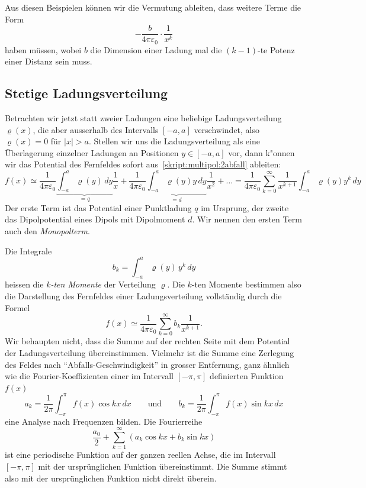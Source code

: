 Aus diesen Beispielen können wir die Vermutung ableiten, dass weitere
Terme die Form
\[
-\frac{b}{4\pi\varepsilon_0}\cdot\frac1{x^k}
\]
haben müssen, wobei $b$ die Dimension einer Ladung mal die $(k-1)$-te
Potenz einer Distanz sein muss.

\subsection{Stetige Ladungsverteilung%
\label{skript:multipol:section:stetigeladungsverteilung}}
Betrachten wir jetzt statt zweier Ladungen eine beliebige 
Ladungsverteilung $\varrho(x)$, die aber ausserhalb des Intervalls
$[-a,a]$ verschwindet, also $\varrho(x)=0$ für $|x|>a$.
Stellen wir uns die Ladungsverteilung als eine Überlagerung einzelner
Ladungen an Positionen $y\in[-a,a]$ vor, dann k"onnen wir das
Potential des Fernfeldes sofort aus~\eqref{skript:multipol:2abfall}
ableiten:
\[
f(x)
\simeq
\frac{1}{4\pi\varepsilon_0}
\underbrace{\int_{-a}^a \varrho(y)\,dy }_{\displaystyle =q}
\frac1x
+
\frac{1}{4\pi\varepsilon_0}
\underbrace{\int_{-a}^a \varrho(y)y \,dy}_{\displaystyle =d}
\frac1{x^2}
+
\dots
=
\frac{1}{4\pi\varepsilon_0}
\sum_{k=0}^\infty
\frac1{x^{k+1}} 
\int_{-a}^a\varrho(y)y^k\,dy
\]
Der erste Term ist das Potential einer Punktladung $q$ im Ursprung, der
zweite das Dipolpotential eines Dipols mit Dipolmoment $d$.
Wir nennen den ersten Term auch den {\em Monopolterm}.
%

Die Integrale 
\[
b_k=\int_{-a}^a \varrho(y)\,y^k\,dy
\]
heissen die {\em $k$-ten Momente} der Verteilung $\varrho$.
%
Die $k$-ten Momente bestimmen also die Darstellung des Fernfeldes
einer Ladungsverteilung vollständig durch die Formel
\[
f(x)
\simeq
\frac1{4\pi\varepsilon_0}\sum_{k=0}^\infty b_k\frac{1}{x^{k+1}}.
\]
Wir behaupten nicht, dass die Summe auf der rechten Seite mit dem Potential
der Ladungsverteilung übereinstimmen.
Vielmehr ist die Summe eine Zerlegung des Feldes
nach ``Abfalls-Geschwindigkeit'' in grosser Entfernung,
ganz ähnlich wie die Fourier-Koeffizienten einer im Intervall
$[-\pi,\pi]$ definierten Funktion $f(x)$
\[
a_k=\frac1{2\pi}\int_{-\pi}^\pi f(x)\cos kx\,dx
\qquad\text{und}\qquad
b_k=\frac1{2\pi}\int_{-\pi}^\pi f(x)\sin kx\,dx
\]
eine Analyse nach Frequenzen bilden.
Die Fourierreihe
\[
\frac{a_0}2+\sum_{k=1}^\infty (a_k\cos kx+b_k\sin kx)
\]
ist eine periodische Funktion auf der ganzen reellen Achse, die
im Intervall $[-\pi,\pi]$ mit der ursprünglichen Funktion übereinstimmt.
Die Summe stimmt also mit der ursprünglichen Funktion nicht direkt
überein.

